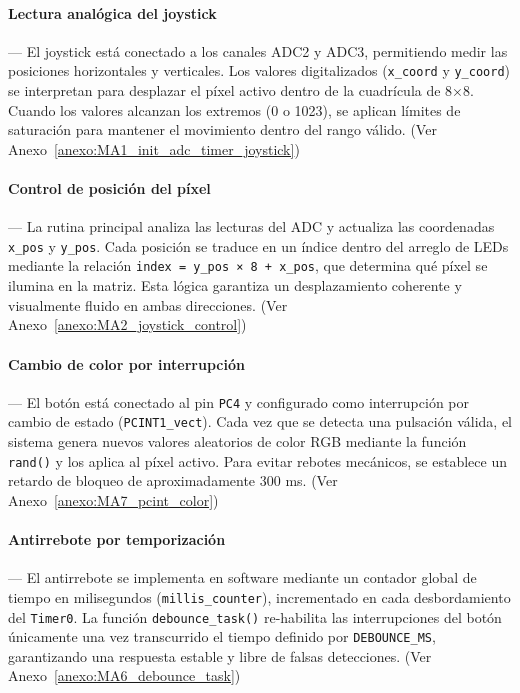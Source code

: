 \vspace{1em}

\paragraph*{\textbf{Lectura analógica del joystick}}---
El joystick está conectado a los canales ADC2 y ADC3, permitiendo medir las posiciones horizontales y verticales. Los valores digitalizados (\texttt{x\_coord} y \texttt{y\_coord}) se interpretan para desplazar el píxel activo dentro de la cuadrícula de 8×8. Cuando los valores alcanzan los extremos (0 o 1023), se aplican límites de saturación para mantener el movimiento dentro del rango válido. (Ver Anexo~\ref{anexo:MA1_init_adc_timer_joystick})

\vspace{1em}

\paragraph*{\textbf{Control de posición del píxel}}---
La rutina principal analiza las lecturas del ADC y actualiza las coordenadas \texttt{x\_pos} y \texttt{y\_pos}. Cada posición se traduce en un índice dentro del arreglo de LEDs mediante la relación \texttt{index = y\_pos × 8 + x\_pos}, que determina qué píxel se ilumina en la matriz. Esta lógica garantiza un desplazamiento coherente y visualmente fluido en ambas direcciones. (Ver Anexo~\ref{anexo:MA2_joystick_control})

\vspace{1em}

\paragraph*{\textbf{Cambio de color por interrupción}}---
El botón está conectado al pin \texttt{PC4} y configurado como interrupción por cambio de estado (\texttt{PCINT1\_vect}). Cada vez que se detecta una pulsación válida, el sistema genera nuevos valores aleatorios de color RGB mediante la función \texttt{rand()} y los aplica al píxel activo. Para evitar rebotes mecánicos, se establece un retardo de bloqueo de aproximadamente 300 ms. (Ver Anexo~\ref{anexo:MA7_pcint_color})

\vspace{1em}

\paragraph*{\textbf{Antirrebote por temporización}}---
El antirrebote se implementa en software mediante un contador global de tiempo en milisegundos (\texttt{millis\_counter}), incrementado en cada desbordamiento del \texttt{Timer0}. La función \texttt{debounce\_task()} re-habilita las interrupciones del botón únicamente una vez transcurrido el tiempo definido por \texttt{DEBOUNCE\_MS}, garantizando una respuesta estable y libre de falsas detecciones. (Ver Anexo~\ref{anexo:MA6_debounce_task})

